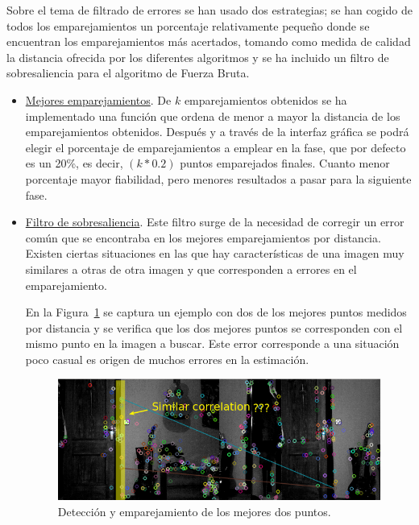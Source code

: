 Sobre el tema de filtrado de errores se han usado dos estrategias; se han cogido de todos los emparejamientos un porcentaje relativamente pequeño donde se encuentran los emparejamientos más acertados, tomando como medida de calidad la distancia ofrecida por los diferentes algoritmos y se ha incluido un filtro de sobresaliencia para el algoritmo de Fuerza Bruta.

\begin{itemize}
\item \underline{Mejores emparejamientos}. De $k$ emparejamientos obtenidos se ha implementado una función que ordena de menor a mayor la distancia de los emparejamientos obtenidos. Después y a través de la interfaz gráfica se podrá elegir el porcentaje de emparejamientos a emplear en la fase, que por defecto es un 20\%, es decir, $(k*0.2)$ puntos emparejados finales. Cuanto menor porcentaje mayor fiabilidad, pero menores resultados a pasar para la siguiente fase.

\item \underline{Filtro de sobresaliencia}. Este filtro surge de la necesidad de corregir un error común que se encontraba en los mejores emparejamientos por distancia. Existen ciertas situaciones en las que hay características de una imagen muy similares a otras de otra imagen y que corresponden a errores en el emparejamiento.

En la Figura~\ref{fig:similarCorrelation} se captura un ejemplo con dos de los mejores puntos medidos por distancia y se verifica que los dos mejores puntos se corresponden con el mismo punto en la imagen a buscar. Este error corresponde a una situación poco casual es origen de muchos errores en la estimación.

\begin{figure}[th]
\centering
\includegraphics[scale=0.6]{Figures/similar-correlation.png}
\decoRule
\caption[similar-correlation]{Detección y emparejamiento de los mejores dos puntos.}
\label{fig:similarCorrelation}
\end{figure}


\end{itemize}
